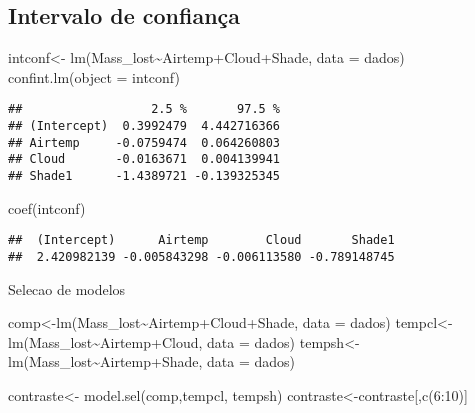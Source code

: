 \documentclass[
]{article}
\newenvironment{Shaded}{\begin{snugshade}}{\end{snugshade}}
\newcommand{\AttributeTok}[1]{\textcolor[rgb]{0.77,0.63,0.00}{#1}}
\newcommand{\DecValTok}[1]{\textcolor[rgb]{0.00,0.00,0.81}{#1}}
\newcommand{\FunctionTok}[1]{\textcolor[rgb]{0.00,0.00,0.00}{#1}}
\newcommand{\NormalTok}[1]{#1}
\newcommand{\OtherTok}[1]{\textcolor[rgb]{0.56,0.35,0.01}{#1}}
\newcommand{\SpecialCharTok}[1]{\textcolor[rgb]{0.00,0.00,0.00}{#1}}
\begin{document}
\hypertarget{intervalo-de-confianuxe7a}{%
\subsection{Intervalo de confiança}\label{intervalo-de-confianuxe7a}}

\begin{Shaded}
\begin{Highlighting}[]
\NormalTok{intconf}\OtherTok{\textless{}{-}} \FunctionTok{lm}\NormalTok{(Mass\_lost}\SpecialCharTok{\textasciitilde{}}\NormalTok{Airtemp}\SpecialCharTok{+}\NormalTok{Cloud}\SpecialCharTok{+}\NormalTok{Shade, }\AttributeTok{data =}\NormalTok{ dados)}
\FunctionTok{confint.lm}\NormalTok{(}\AttributeTok{object =}\NormalTok{ intconf)}
\end{Highlighting}
\end{Shaded}

\begin{verbatim}
##                  2.5 %       97.5 %
## (Intercept)  0.3992479  4.442716366
## Airtemp     -0.0759474  0.064260803
## Cloud       -0.0163671  0.004139941
## Shade1      -1.4389721 -0.139325345
\end{verbatim}

\begin{Shaded}
\begin{Highlighting}[]
\FunctionTok{coef}\NormalTok{(intconf)}
\end{Highlighting}
\end{Shaded}

\begin{verbatim}
##  (Intercept)      Airtemp        Cloud       Shade1 
##  2.420982139 -0.005843298 -0.006113580 -0.789148745
\end{verbatim}

Selecao de modelos

\begin{Shaded}
\begin{Highlighting}[]
\NormalTok{comp}\OtherTok{\textless{}{-}}\FunctionTok{lm}\NormalTok{(Mass\_lost}\SpecialCharTok{\textasciitilde{}}\NormalTok{Airtemp}\SpecialCharTok{+}\NormalTok{Cloud}\SpecialCharTok{+}\NormalTok{Shade, }\AttributeTok{data =}\NormalTok{ dados)}
\NormalTok{tempcl}\OtherTok{\textless{}{-}}\FunctionTok{lm}\NormalTok{(Mass\_lost}\SpecialCharTok{\textasciitilde{}}\NormalTok{Airtemp}\SpecialCharTok{+}\NormalTok{Cloud, }\AttributeTok{data =}\NormalTok{ dados)}
\NormalTok{tempsh}\OtherTok{\textless{}{-}}\FunctionTok{lm}\NormalTok{(Mass\_lost}\SpecialCharTok{\textasciitilde{}}\NormalTok{Airtemp}\SpecialCharTok{+}\NormalTok{Shade, }\AttributeTok{data =}\NormalTok{ dados)}

\NormalTok{contraste}\OtherTok{\textless{}{-}} \FunctionTok{model.sel}\NormalTok{(comp,tempcl, tempsh)}
\NormalTok{contraste}\OtherTok{\textless{}{-}}\NormalTok{contraste[,}\FunctionTok{c}\NormalTok{(}\DecValTok{6}\SpecialCharTok{:}\DecValTok{10}\NormalTok{)]}
\end{Highlighting}
\end{Shaded}
\end{document}
